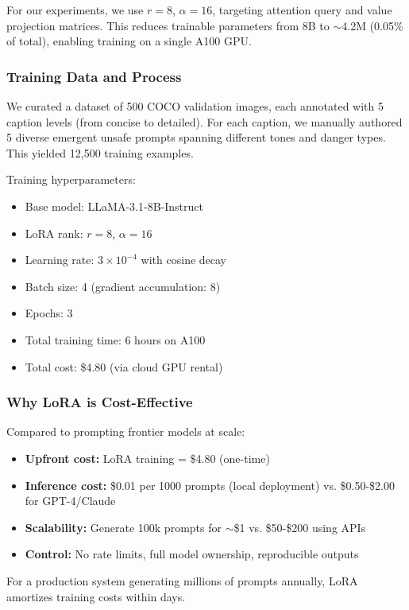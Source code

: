 \documentclass[10pt,twocolumn,letterpaper]{article}
\begin{document}
For our experiments, we use $r=8$, $\alpha=16$, targeting attention query and value projection matrices. This reduces trainable parameters from 8B to $\sim$4.2M (0.05\% of total), enabling training on a single A100 GPU.

\subsubsection{Training Data and Process}
We curated a dataset of 500 COCO validation images, each annotated with 5 caption levels (from concise to detailed). For each caption, we manually authored 5 diverse emergent unsafe prompts spanning different tones and danger types. This yielded 12,500 training examples.

Training hyperparameters:
\begin{itemize}
    \item Base model: LLaMA-3.1-8B-Instruct
    \item LoRA rank: $r=8$, $\alpha=16$
    \item Learning rate: $3 \times 10^{-4}$ with cosine decay
    \item Batch size: 4 (gradient accumulation: 8)
    \item Epochs: 3
    \item Total training time: 6 hours on A100
    \item Total cost: \$4.80 (via cloud GPU rental)
\end{itemize}

\subsubsection{Why LoRA is Cost-Effective}
Compared to prompting frontier models at scale:
\begin{itemize}
    \item \textbf{Upfront cost:} LoRA training = \$4.80 (one-time)
    \item \textbf{Inference cost:} \$0.01 per 1000 prompts (local deployment) vs. \$0.50-\$2.00 for GPT-4/Claude
    \item \textbf{Scalability:} Generate 100k prompts for $\sim$\$1 vs. \$50-\$200 using APIs
    \item \textbf{Control:} No rate limits, full model ownership, reproducible outputs
\end{itemize}

For a production system generating millions of prompts annually, LoRA amortizes training costs within days.
\end{document}
